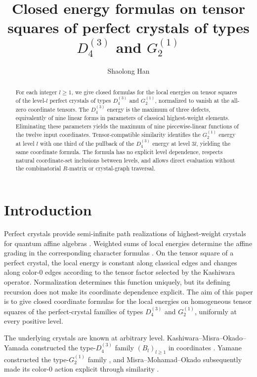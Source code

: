 \documentclass[11pt,reqno]{amsart}
\title[Closed energy formulas in types $D_4^{(3)}$ and $G_2^{(1)}$]
{Closed energy formulas on tensor squares of perfect crystals of types $D_4^{(3)}$ and $G_2^{(1)}$}
\author{Shaolong Han}
\date{}
\numberwithin{table}{section}
\numberwithin{equation}{section}
\theoremstyle{plain}
\theoremstyle{definition}
\begin{document}
\begin{abstract}
For each integer $l\ge1$, we give closed formulas for the local
energies on tensor squares of the level-$l$ perfect crystals of types $D_4^{(3)}$ and $G_2^{(1)}$, normalized to vanish at the all-zero coordinate tensors.
The $D_4^{(3)}$ energy is the maximum of three defects, equivalently of nine linear forms in parameters of classical highest-weight elements.
Eliminating these parameters yields the maximum of nine piecewise-linear functions of the twelve input coordinates.
Tensor-compatible similarity identifies the $G_2^{(1)}$ energy
at level $l$ with one third of the pullback of the $D_4^{(3)}$
energy at level $3l$, yielding the same coordinate formula.
The formula has no explicit level dependence, respects natural
coordinate-set inclusions between levels, and allows direct evaluation without the combinatorial $R$-matrix or crystal-graph traversal.
\end{abstract}

\maketitle

\section{Introduction}

Perfect crystals provide semi-infinite path realizations of highest-weight crystals for quantum affine algebras \cite{KMN2}.
Weighted sums of local energies determine the affine grading in the corresponding character formulas \cite{KMN1}.
On the tensor square of a perfect crystal, the local energy is constant along classical edges and changes along color-\(0\) edges according to the tensor factor selected by the Kashiwara operator.
Normalization determines this function uniquely, but its defining recursion does not make its coordinate dependence explicit.
The aim of this paper is to give closed coordinate formulas for the local energies on homogeneous tensor squares of the perfect-crystal families of types \(D_4^{(3)}\) and \(G_2^{(1)}\), uniformly at every positive level.

The underlying crystals are known at arbitrary level.
Kashiwara--Misra--Okado--Yamada constructed the type-\(D_4^{(3)}\) family \((B_l)_{l\ge1}\) in coordinates \cite{KMOY}.
Yamane constructed the type-\(G_2^{(1)}\) family \cite{Yamane}, and Misra--Mohamad--Okado subsequently made its color-\(0\) action explicit through similarity \cite{MMO}.
\end{document}
